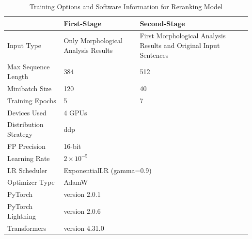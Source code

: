 \documentclass[AMS,STIX2COL]{WileyNJD-v2}
\begin{document}
    \begin{table}[ht]
        \centering
        \footnotesize
        \caption{Training Options and Software Information for Reranking Model}
        \label{tab:training-options}
        \begin{tabular}{|p{24mm}|p{25mm}|p{25mm}|}
            \hline
            ~                     & \textbf{First-Stage}                & \textbf{Second-Stage}                                        \\ \hline
            Input Type            & Only Morphological Analysis Results & First Morphological Analysis Results and Original Input Sentences \\ \hline
            Max Sequence Length   & 384                                 & 512                                                               \\ \hline
            Minibatch Size        & 120                                 & 40                                                                \\ \hline
            Training Epochs       & 5                                   & 7                                                                 \\ \hline
            Devices Used          & \multicolumn{2}{l|}{4 GPUs}                                                                             \\ \hline
            Distribution Strategy & \multicolumn{2}{l|}{ddp}                                                                                \\ \hline
            FP Precision          & \multicolumn{2}{l|}{16-bit}                                                                             \\ \hline
            Learning Rate         & \multicolumn{2}{l|}{$2 \times 10^{-5}$}                                                                 \\ \hline
            LR Scheduler          & \multicolumn{2}{l|}{ExponentialLR (gamma=0.9)}                                                          \\ \hline
            Optimizer Type        & \multicolumn{2}{l|}{AdamW}                                                                              \\ \hline
            PyTorch               & \multicolumn{2}{l|}{version 2.0.1}                                                                      \\ \hline
            PyTorch Lightning     & \multicolumn{2}{l|}{version 2.0.6}                                                                      \\ \hline
            Transformers          & \multicolumn{2}{l|}{version 4.31.0}                                                                     \\ \hline
        \end{tabular}
    \end{table}
\end{document}
